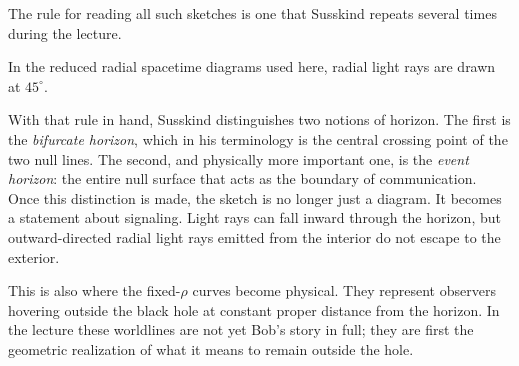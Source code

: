\begin{figure}[h]
\centering
{}
\end{figure}

The rule for reading all such sketches is one that Susskind repeats several times during the lecture.

\begin{definition}
In the reduced radial spacetime diagrams used here, radial light rays are drawn at \(45^\circ\).
\end{definition}

With that rule in hand, Susskind distinguishes two notions of horizon. The first is the \emph{bifurcate horizon}, which in his terminology is the central crossing point of the two null lines. The second, and physically more important one, is the \emph{event horizon}: the entire null surface that acts as the boundary of communication. Once this distinction is made, the sketch is no longer just a diagram. It becomes a statement about signaling. Light rays can fall inward through the horizon, but outward-directed radial light rays emitted from the interior do not escape to the exterior.

This is also where the fixed-\(\rho\) curves become physical. They represent observers hovering outside the black hole at constant proper distance from the horizon. In the lecture these worldlines are not yet Bob's story in full; they are first the geometric realization of what it means to remain outside the hole.

